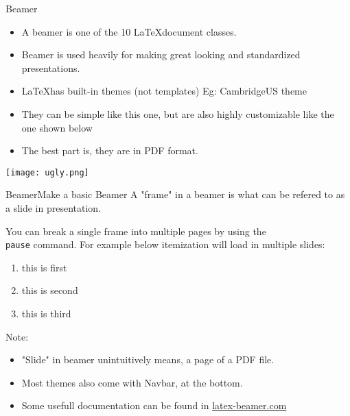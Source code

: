 \begin{frame}{Beamer}

    \begin{itemize}
        \item A beamer is one of the 10 \LaTeX  document classes.
        \item Beamer is used heavily for making great looking and standardized
            presentations.
        \item \LaTeX has built-in themes (not templates) Eg: CambridgeUS theme
        \item They can be simple like this one, but are also highly customizable
            like the one shown below
        \item The best part is, they are in PDF format.
    \end{itemize}

    \center
    \texttt{[image: ugly.png]}

\end{frame}


\begin{frame}{Beamer}{Make a basic Beamer}
    A "frame" in a beamer is what can be refered to as a slide in
    presentation.\vspace{1em}

    You can break a single frame into multiple pages by using the \texttt{\\pause}
    command. For example below itemization will load in multiple slides: \vspace{1em}

    \begin{enumerate}
        \item \pause this is first
        \item \pause this is second
        \item \pause this is third
    \end{enumerate}

    \pause
    Note:
    \begin{itemize}
        \item "Slide" in beamer unintuitively means, a page of a PDF file.
        \item Most themes also come with Navbar, at the bottom.
        \item Some usefull documentation can be found in
            \href{https://latex-beamer.com}{latex-beamer.com}
    \end{itemize}
\end{frame}

